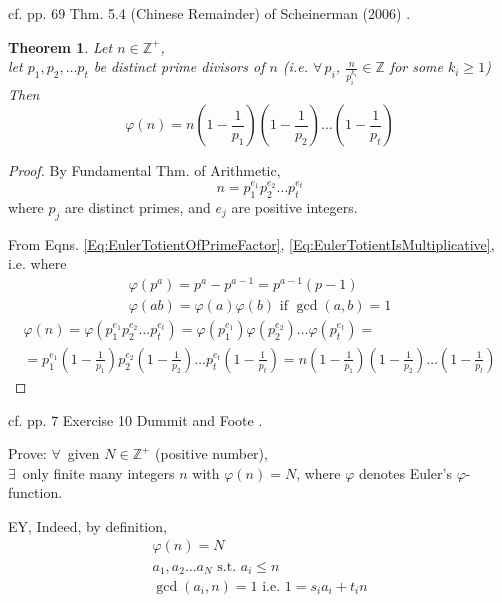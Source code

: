 \documentclass[10pt]{amsart}
\newtheorem{theorem}{Theorem}
\newcommand{\exercisehead}[1]
  { \smallskip
   \noindent{\small\bf Exercise #1.}
  }
\begin{document}
\begin{multicols*}{2}
cf. pp. 69 Thm. 5.4 (Chinese Remainder) of Scheinerman (2006) \cite{Sche2006}.  
\begin{theorem}
	Let $n\in \mathbb{Z}^+$, \\
	let $p_1,p_2, \dots p_t$ be distinct prime divisors of $n$ (i.e. $\forall \, p_i$, $\frac{n}{p_i^{k_i}} \in \mathbb{Z}$ for some $k_i \geq 1$) \\
	Then
	\begin{equation}
	\varphi(n) = n\left( 1 - \frac{1}{p_1} \right)\left( 1- \frac{1}{p_2} \right) \dots \left(1 - \frac{1}{p_t} \right)
	\end{equation}
\end{theorem}

\begin{proof}
	By Fundamental Thm. of Arithmetic, 
	\[
	n = p_1^{e_1} p_2^{e_2} \dots p_t^{e_t} 
	\]
	where $p_j$ are distinct primes, and $e_j$ are positive integers.  
	
	From Eqns. \ref{Eq:EulerTotientOfPrimeFactor}, \ref{Eq:EulerTotientIsMultiplicative}, i.e. where 
	\[
	\begin{gathered}
	\varphi(p^a) = p^a - p^{a-1} = p^{a-1} (p-1) \\
	\varphi(ab) = \varphi(a) \varphi(b)  \text{ if } \gcd(a,b) = 1
		\end{gathered}
		\]
		\[
		\begin{gathered}
	\varphi(n) = \varphi(p_1^{e_1}p_2^{e_2} \dots p_t^{e_t}) = \varphi(p_1^{e_1}) \varphi(p_2^{e_2}) \dots \varphi(p_t^{e_t}) = \\
	= p_1^{e_1} (1- \frac{1}{p_1} )p_2^{e_2} (1- \frac{1}{p_2} ) \dots p_t^{e_t} (1- \frac{1}{p_t} ) = n(1- \frac{1}{p_1}) (1- \frac{1}{p_2}) \dots (1- \frac{1}{p_t})
		\end{gathered}
		\]
	\end{proof}


\exercisehead{10}
cf. pp. 7 Exercise 10 Dummit and Foote \cite{DuFo2003}.  

Prove: $\forall \, $ given $N \in \mathbb{Z}^+$ (positive number), \\
$\exists \, $ only finite many integers $n$ with $\varphi(n) = N$, where $\varphi$ denotes Euler's $\varphi$-function.  

EY, Indeed, by definition, \\
\[
\begin{gathered}
\varphi(n) = N \\
a_1, a_2 \dots a_N \text{ s.t. } a_i \leq n \\
\gcd(a_i,n)=1 \text{ i.e. } 1 = s_i a_i + t_i n 
\end{gathered}
\]



\end{multicols*}
\end{document}
